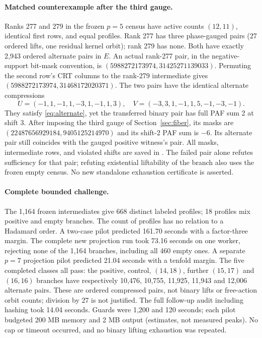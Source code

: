 \documentclass[11pt]{article}
\begin{document}
\paragraph{Matched counterexample after the third gauge.}
Ranks 277 and 279 in the frozen $p=5$ census have active counts $(12,11)$,
identical first rows, and equal profiles. Rank 277 has three phase-gauged
pairs (27 ordered lifts, one residual kernel orbit); rank 279 has none.
Both have exactly 2,943 ordered alternate pairs in $E$. An actual
rank-277 pair, in the negative-support bit-mask convention, is
$(5988272173974,31425271139033)$. Permuting the second row's CRT columns
to the rank-279 intermediate gives $(5988272173974,31468172020371)$.
The two pairs have the identical alternate compressions
\[
 U=(-1,1,-1,1,-3,1,-1,1,3),\quad
 V=(-3,3,1,-1,1,5,-1,-3,-1).
\]
They satisfy \eqref{eq:alternate}, yet the transferred binary pair has
full PAF sum 2 at shift 3. After imposing the third gauge of
Section~\ref{sec:fiber}, its masks are
$(22487656929184,9405125214970)$ and its shift-2 PAF sum is $-6$.
Its alternate pair still coincides with the gauged positive witness's pair.
All masks, intermediate rows, and violated shifts are saved in
.
The failed pair alone refutes sufficiency for that pair; refuting
existential liftability of the branch also uses the frozen empty census.
No new standalone exhaustion certificate is asserted.

\paragraph{Complete bounded challenge.}
The 1,164 frozen intermediates give 668 distinct labeled profiles; 18
profiles mix positive and empty branches. The count of profiles has no
relation to a Hadamard order. A two-case pilot predicted 161.70 seconds
with a factor-three margin. The complete new projection run took 73.16
seconds on one worker, rejecting none of the 1,164 branches, including
all 460 empty ones. A separate $p=7$ projection pilot predicted 21.04
seconds with a tenfold margin. The five completed classes all pass:
the positive, control, $(14,18)$, further $(15,17)$ and $(16,16)$ branches
have respectively 10,476, 10,755, 11,925, 11,943 and 12,006 alternate pairs.
These are ordered compressed pairs, not binary lifts or free-action orbit
counts; division by 27 is not justified. The full follow-up audit including
hashing took 14.04 seconds. Guards were 1,200 and 120 seconds; each pilot
budgeted 200 MB memory and 2 MB output (estimates, not measured peaks).
No cap or timeout occurred, and no binary lifting exhaustion was repeated.
\end{document}
